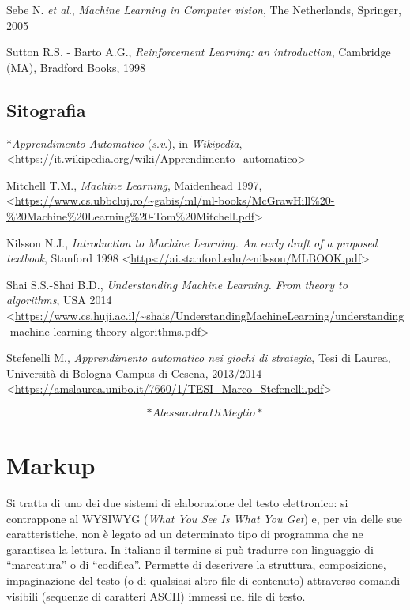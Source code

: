 \documentclass[
  b5paper,
  twoside,
  11pt,
  chapterprefix=false,
  bibliography=totocnumbered,
  parskip=0]{scrbook}
\begin{document}
Sebe N. \emph{et al}., \emph{Machine Learning in Computer vision}, The
Netherlands, Springer, 2005

Sutton R.S. - Barto A.G., \emph{Reinforcement Learning: an introduction},
Cambridge (MA), Bradford Books, 1998

\hypertarget{sitografia-20}{%
\section*{Sitografia}\label{sitografia-20}}

*\emph{Apprendimento Automatico} (\emph{s}.\emph{v}.), in \emph{Wikipedia},
\textless{}\href{https://it.wikipedia.org/wiki/Apprendimento_automatico}{{https://it.wikipedia.org/wiki/Apprendimento\_automatico}}\textgreater{}

Mitchell T.M., \emph{Machine Learning}, Maidenhead 1997,
\textless{}\href{https://www.cs.ubbcluj.ro/~gabis/ml/ml-books/McGrawHill\%20-\%20Machine\%20Learning\%20-Tom\%20Mitchell.pdf}{{https://www.cs.ubbcluj.ro/\textasciitilde gabis/ml/ml-books/McGrawHill\%20-\%20Machine\%20Learning\%20-Tom\%20Mitchell.pdf}}\textgreater{}

Nilsson N.J., \emph{Introduction to Machine Learning. An early draft of a
proposed textbook}, Stanford 1998
\textless{}\href{https://ai.stanford.edu/~nilsson/MLBOOK.pdf}{{https://ai.stanford.edu/\textasciitilde nilsson/MLBOOK.pdf}}\textgreater{}

Shai S.S.-Shai B.D., \emph{Understanding Machine Learning. From theory to
algorithms}, USA 2014
\textless{}\href{https://www.cs.huji.ac.il/~shais/UnderstandingMachineLearning/understanding-machine-learning-theory-algorithms.pdf}{{https://www.cs.huji.ac.il/\textasciitilde shais/UnderstandingMachineLearning/understanding-machine-learning-theory-algorithms.pdf}}\textgreater{}

Stefenelli M., \emph{Apprendimento automatico nei giochi di strategia}, Tesi
di Laurea, Università di Bologna Campus di Cesena, 2013/2014
\textless{}{\url{https://amslaurea.unibo.it/7660/1/TESI_Marco_Stefenelli.pdf}\textgreater{}}

\[*Alessandra Di Meglio*\]

\hypertarget{markup}{%
\chapter{Markup}\label{markup}}

Si tratta di uno dei due sistemi di elaborazione del testo elettronico:
si contrappone al WYSIWYG (\emph{What You See Is What You Get}) e, per via
delle sue caratteristiche, non è legato ad un determinato tipo di
programma che ne garantisca la lettura. In italiano il termine si può
tradurre con linguaggio di \enquote{marcatura} o di \enquote{codifica}. Permette di
descrivere la struttura, composizione, impaginazione del testo (o di
qualsiasi altro file di contenuto) attraverso comandi visibili (sequenze
di caratteri ASCII) immessi nel file di testo.
\end{document}
